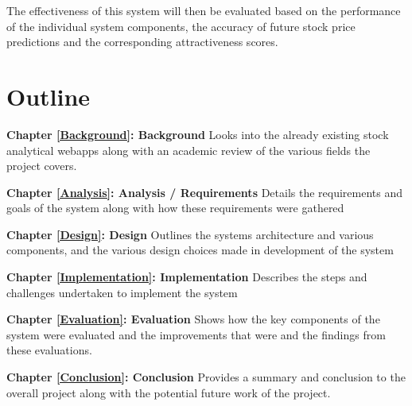 The effectiveness of this system will then be evaluated based on the performance of the individual system components, the accuracy of future stock price predictions and the corresponding attractiveness scores.


\section{Outline}

\textbf{Chapter \ref{Background}: Background} Looks into the already existing stock analytical webapps along with an academic review of the various fields the project covers. 
    

\textbf{Chapter \ref{Analysis}: Analysis / Requirements} Details the requirements and goals of the system along with how these requirements were gathered
    
\textbf{Chapter \ref{Design}: Design} Outlines the systems architecture and various components, and the various design choices made in development of the system

\textbf{Chapter \ref{Implementation}: Implementation} Describes the steps and challenges undertaken to implement the system
    
\textbf{Chapter \ref{Evaluation}: Evaluation} Shows how the key components of the system were evaluated and the improvements that were and the findings from these evaluations.  
    
\textbf{Chapter \ref{Conclusion}: Conclusion} Provides a summary and conclusion to the overall project along with the potential future work of the project. 
    
